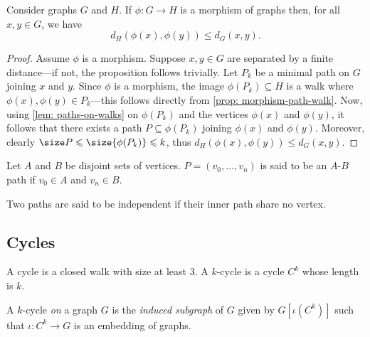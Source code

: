 \begin{corollary}
    \label{cor: morphism-cycle}
    Consider graphs \(G\) and \(H\). If \(\phi: G \to H\) is a morphism of
    graphs then, for all \(x, y \in G\), we have
    \[
        d_H(\phi(x), \phi(y)) \leq d_G(x, y).
    \]
\end{corollary}

\begin{proof}
    Assume \(\phi\) is a morphism. Suppose \(x, y \in G\) are separated by a
    finite distance---if not, the proposition follows trivially. Let \(P_k\) be
    a minimal path on \(G\) joining \(x\) and \(y\). Since \(\phi\) is a morphism,
    the image \(\phi(P_k) \subseteq H\) is a walk where \(\phi(x), \phi(y) \in
    P_k\)---this follows directly from \cref{prop: morphism-path-walk}. Now,
    using \cref{lem: paths-on-walks} on \(\phi(P_k)\) and the vertices \(\phi(x)\)
    and \(\phi(y)\), it follows that there exists a path \(P \subseteq \phi(P_k)\)
    joining \(\phi(x)\) and \(\phi(y)\). Moreover, clearly \(\size P \leq
    \size{\phi(P_k)} \leq k\), thus \(d_H(\phi(x), \phi(y)) \leq d_G(x, y)\).
\end{proof}

\begin{definition}\label{def: A-B-path}
    Let \(A\) and \(B\) be disjoint sets of vertices. \(P = (v_0, \dots, v_n)\) is
    said to be an \(A\)-\(B\) path if \(v_0 \in A\) and \(v_n \in B\).
\end{definition}

\begin{definition}\label{def: independent-paths}
    Two paths are said to be independent if their inner path share no vertex.
\end{definition}

\subsection{Cycles}

\begin{definition}\label{def: cycle}
    A cycle is a closed walk with size at least \(3\). A \(k\)-cycle is a cycle
    \(C^k\) whose length is \(k\).

    A \(k\)-cycle \emph{on} a graph \(G\) is the \emph{induced subgraph} of \(G\)
    given by \(G[\iota(C^k)]\) such that \(\iota: C^k \to G\) is an embedding of
    graphs.
\end{definition}

